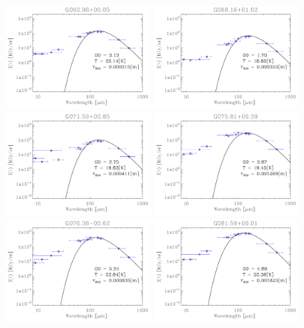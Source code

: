 \begin{figure}
\centering
\includegraphics[trim=-1mm -1mm -1mm -1mm, clip, width=55mm]{appB/appB_18.pdf}
\includegraphics[trim=-1mm -1mm -1mm -1mm, clip, width=55mm]{appB/appB_19.pdf}
\includegraphics[trim=-1mm -1mm -1mm -1mm, clip, width=55mm]{appB/appB_20.pdf}
\includegraphics[trim=-1mm -1mm -1mm -1mm, clip, width=55mm]{appB/appB_21.pdf}
\includegraphics[trim=-1mm -1mm -1mm -1mm, clip, width=55mm]{appB/appB_22.pdf}
\includegraphics[trim=-1mm -1mm -1mm -1mm, clip, width=55mm]{appB/appB_23.pdf}

\end{figure}
